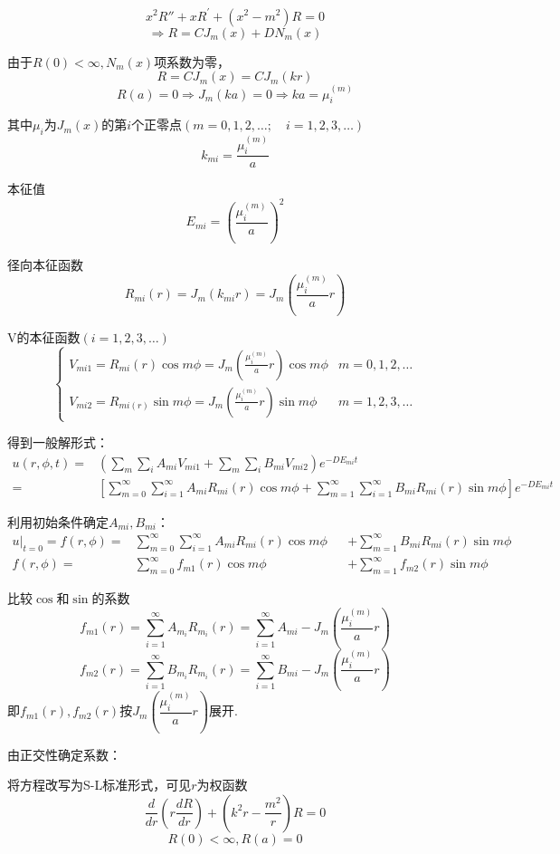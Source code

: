 \begin{ex}[扩散问题]
$$x^{2}R''+xR^{\prime}+(x^{2}-m^{2})R=0$$
$$\Rightarrow R=CJ_{m}(x)+DN_{m}(x)$$

由于$R(0)<\infty, N_m(x)$项系数为零，
$$R=CJ_{m}(x)=CJ_{m}(kr)$$
$$R(a)=0\Rightarrow J_{m}(ka)=0\Rightarrow ka=\mu_{i}^{(m)}$$

其中$\mu_i$为$J_m(x)$的第$i$个正零点$(m=0,1,2,\dots;\quad i=1,2,3,\dots)$
$$k_{mi}=\frac{\mu_{i}^{(m)}}{a}$$

本征值
$$E_{mi}=\left(\frac{\mu_{i}^{(m)}}{a}\right)^{2}$$

径向本征函数
$$R_{mi}(r)=J_{m}(k_{mi}r)=J_{m}\left(\frac{\mu_{i}^{(m)}}{a}r\right)$$

V的本征函数$(i=1,2,3,\dots)$
$$\begin{cases}
    V_{mi1}=R_{mi}(r)\cos m\phi=J_{m}\left(\frac{\mu_{i}^{(m)}}{a}r\right)\cos m\phi&m=0,1,2,\dots\\
    V_{mi2}=R_{mi(r)}\sin m\phi=J_{m}\left(\frac{\mu_{i}^{(m)}}{a}r\right)\sin m\phi&m=1,2,3,\dots
\end{cases}$$

\noindent 得到一般解形式：
$$\begin{aligned}
u(r,\phi,t)=&\left(\sum_{m}\sum_{i}A_{mi}V_{mi1}+\sum_{m}\sum_{i}B_{mi}V_{mi2}\right)e^{-DE_{mi}t}\\
=&\left[\sum_{m=0}^{\infty}\sum_{i=1}^{\infty}A_{mi}R_{mi}(r)\cos m\phi+\sum_{m=1}^{\infty}\sum_{i=1}^{\infty}B_{mi}R_{mi}(r)\sin m\phi\right]e^{-DE_{mi}t}
\end{aligned}$$

\noindent 利用初始条件确定$A_{mi},B_{mi}$：
$$\begin{aligned}
u|_{t=0}=f(r,\phi)=&\sum_{m=0}^{\infty}\sum_{i=1}^{\infty}A_{mi}R_{mi}(r)\cos m\phi &&+\sum_{m=1}^{\infty}B_{mi}R_{mi}(r)\sin m\phi\\
f(r,\phi)=&\sum_{m=0}^{\infty}f_{m1}(r)\cos m\phi &&+\sum_{m=1}^{\infty}f_{m2}(r)\sin m\phi 
\end{aligned}$$

比较$\cos$和$\sin$的系数
$$f_{m1}(r)=\sum_{i=1}^{\infty}A_{m_{i}}R_{m_{i}}(r)=\sum_{i=1}^{\infty}A_{mi}-J_{m}\left(\frac{\mu_{i}^{(m)}}{a}r\right)$$
$$f_{m2}(r)=\sum_{i=1}^{\infty}B_{m_{i}}R_{m_{i}}(r)=\sum_{i=1}^{\infty}B_{mi}-J_{m}\left(\frac{\mu_{i}^{(m)}}{a}r\right)$$
即$f_{m1}(r),f_{m2}(r)$按$J_{m}\left(\dfrac{\mu_{i}^{(m)}}{a}r\right)$展开.

\noindent 由正交性确定系数：

将方程改写为S-L标准形式，可见$r$为权函数
$$\frac{d}{dr}\left(r\frac{dR}{dr}\right)+(k^{2}r-\frac{m^{2}}{r})R=0$$
$$R(0)<\infty,R(a)=0$$


\end{ex}
